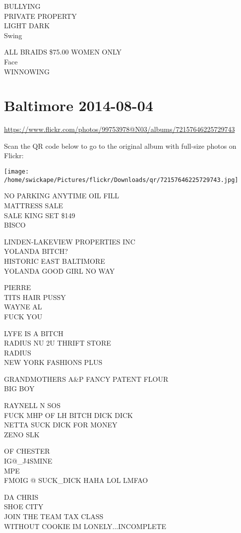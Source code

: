 \documentclass[10pt,letterpaper]{article}
\begin{document}
BULLYING\\
PRIVATE PROPERTY\\
LIGHT DARK\\
Swing

ALL BRAIDS \$75.00 WOMEN ONLY\\
Face\\
WINNOWING


\section*{Baltimore 2014-08-04}

\url{https://www.flickr.com/photos/99753978@N03/albums/72157646225729743}

Scan the QR code below to go to the original album with full-size photos on Flickr:

\texttt{[image: /home/swickape/Pictures/flickr/Downloads/qr/72157646225729743.jpg]}


NO PARKING ANYTIME OIL FILL\\
MATTRESS SALE\\
SALE KING SET \$149\\
BISCO

LINDEN{-}LAKEVIEW PROPERTIES INC\\
YOLANDA BITCH?\\
HISTORIC EAST BALTIMORE\\
YOLANDA GOOD GIRL NO WAY

PIERRE\\
TITS HAIR PUSSY\\
WAYNE AL\\
FUCK YOU

LYFE IS A BITCH\\
RADIUS NU 2U THRIFT STORE\\
RADIUS\\
NEW YORK FASHIONS PLUS

GRANDMOTHERS A\&P FANCY PATENT FLOUR\\
BIG BOY

RAYNELL N SOS\\
FUCK MHP OF LH BITCH DICK DICK\\
NETTA SUCK DICK FOR MONEY\\
ZENO SLK

OF CHESTER\\
IG@\_J4SMINE\\
MPE\\
FMOIG @ SUCK\_DICK HAHA LOL LMFAO

DA CHRIS\\
SHOE CITY\\
JOIN THE TEAM TAX CLASS\\
WITHOUT COOKIE IM LONELY...INCOMPLETE
\end{document}
